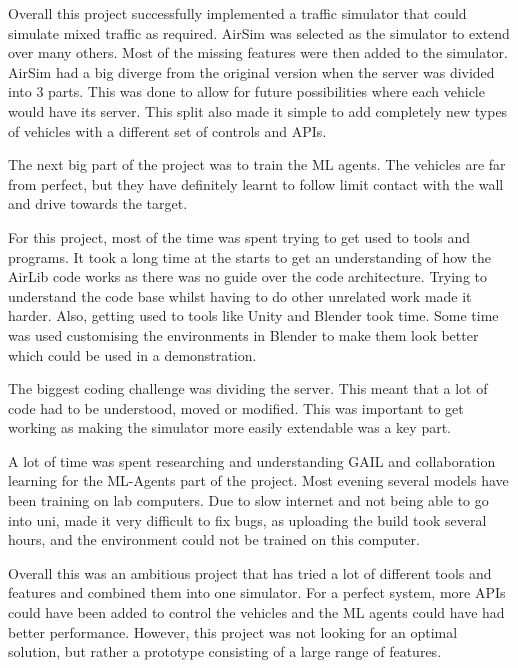 Overall this project successfully implemented a traffic simulator that could simulate mixed traffic as required. AirSim was selected as the simulator to extend over many others. Most of the missing features were then added to the simulator. AirSim had a big diverge from the original version when the server was divided into 3 parts. This was done to allow for future possibilities where each vehicle would have its server. This split also made it simple to add completely new types of vehicles with a different set of controls and APIs. 

The next big part of the project was to train the ML agents. The vehicles are far from perfect, but they have definitely learnt to follow limit contact with the wall and drive towards the target. 

For this project, most of the time was spent trying to get used to tools and programs. It took a long time at the starts to get an understanding of how the AirLib code works as there was no guide over the code architecture. Trying to understand the code base whilst having to do other unrelated work made it harder. Also, getting used to tools like Unity and Blender took time. Some time was used customising the environments in Blender to make them look better which could be used in a demonstration.

The biggest coding challenge was dividing the server. This meant that a lot of code had to be understood, moved or modified. This was important to get working as making the simulator more easily extendable was a key part. 

A lot of time was spent researching and understanding GAIL and collaboration learning for the ML-Agents part of the project. Most evening several models have been training on lab computers. Due to slow internet and not being able to go into uni, made it very difficult to fix bugs, as uploading the build took several hours, and the environment could not be trained on this computer. 

Overall this was an ambitious project that has tried a lot of different tools and features and combined them into one simulator. For a perfect system, more APIs could have been added to control the vehicles and the ML agents could have had better performance. However, this project was not looking for an optimal solution, but rather a prototype consisting of a large range of features. 